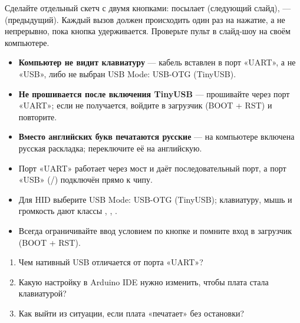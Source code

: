 Сделайте отдельный скетч с двумя кнопками:  посылает  (следующий слайд),
 ---  (предыдущий). Каждый вызов должен происходить один раз на нажатие, а не
непрерывно, пока кнопка удерживается. Проверьте пульт в слайд-шоу на своём компьютере.

\begin{trouble}
\begin{itemize}[leftmargin=*]
  \item \textbf{Компьютер не видит клавиатуру} --- кабель вставлен в порт «UART», а не «USB», либо не выбран \textsf{USB Mode: USB-OTG (TinyUSB)}.
  \item \textbf{Не прошивается после включения TinyUSB} --- прошивайте через порт «UART»; если не получается, войдите в загрузчик (BOOT + RST) и повторите.
  \item \textbf{Вместо английских букв печатаются русские} --- на компьютере включена русская раскладка; переключите её на английскую.
\end{itemize}
\end{trouble}

\begin{summary}
\begin{itemize}[leftmargin=*]
  \item Порт «UART» работает через мост и даёт последовательный порт, а порт «USB» (/) подключён прямо к чипу.
  \item Для HID выберите \textsf{USB Mode: USB-OTG (TinyUSB)}; клавиатуру, мышь и громкость дают классы , , .
  \item Всегда ограничивайте ввод условием по кнопке и помните вход в загрузчик (BOOT + RST).
\end{itemize}
\end{summary}

\begin{selfcheck}
\begin{enumerate}
  \item Чем нативный USB отличается от порта «UART»?
  \item Какую настройку в Arduino IDE нужно изменить, чтобы плата стала клавиатурой?
  \item Как выйти из ситуации, если плата «печатает» без остановки?
\end{enumerate}
\end{selfcheck}

